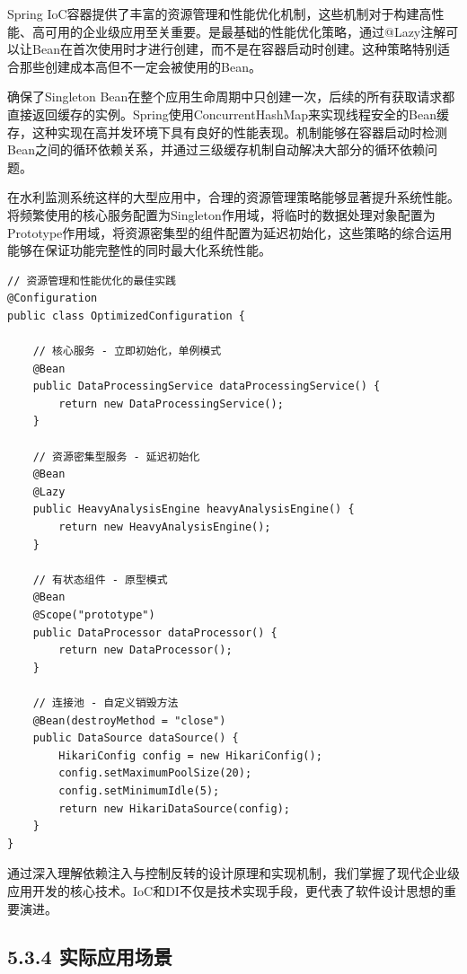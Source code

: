Spring IoC容器提供了丰富的资源管理和性能优化机制，这些机制对于构建高性能、高可用的企业级应用至关重要。是最基础的性能优化策略，通过@Lazy注解可以让Bean在首次使用时才进行创建，而不是在容器启动时创建。这种策略特别适合那些创建成本高但不一定会被使用的Bean。

确保了Singleton Bean在整个应用生命周期中只创建一次，后续的所有获取请求都直接返回缓存的实例。Spring使用ConcurrentHashMap来实现线程安全的Bean缓存，这种实现在高并发环境下具有良好的性能表现。机制能够在容器启动时检测Bean之间的循环依赖关系，并通过三级缓存机制自动解决大部分的循环依赖问题。

在水利监测系统这样的大型应用中，合理的资源管理策略能够显著提升系统性能。将频繁使用的核心服务配置为Singleton作用域，将临时的数据处理对象配置为Prototype作用域，将资源密集型的组件配置为延迟初始化，这些策略的综合运用能够在保证功能完整性的同时最大化系统性能。

\begin{lstlisting}[style=java]
// 资源管理和性能优化的最佳实践
@Configuration
public class OptimizedConfiguration {
    
    // 核心服务 - 立即初始化，单例模式
    @Bean
    public DataProcessingService dataProcessingService() {
        return new DataProcessingService();
    }
    
    // 资源密集型服务 - 延迟初始化
    @Bean
    @Lazy
    public HeavyAnalysisEngine heavyAnalysisEngine() {
        return new HeavyAnalysisEngine();
    }
    
    // 有状态组件 - 原型模式
    @Bean
    @Scope("prototype")
    public DataProcessor dataProcessor() {
        return new DataProcessor();
    }
    
    // 连接池 - 自定义销毁方法
    @Bean(destroyMethod = "close")
    public DataSource dataSource() {
        HikariConfig config = new HikariConfig();
        config.setMaximumPoolSize(20);
        config.setMinimumIdle(5);
        return new HikariDataSource(config);
    }
}
\end{lstlisting}

通过深入理解依赖注入与控制反转的设计原理和实现机制，我们掌握了现代企业级应用开发的核心技术。IoC和DI不仅是技术实现手段，更代表了软件设计思想的重要演进。

\hypertarget{ux5b9eux9645ux5e94ux7528ux573aux666f}{%
\subsection{5.3.4 实际应用场景}\label{ux5b9eux9645ux5e94ux7528ux573aux666f}}

